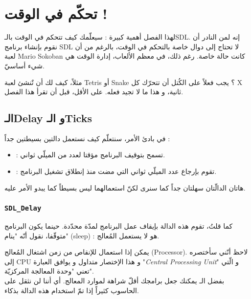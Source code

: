 \chapter{تحكّم في الوقت !}

لهذا الفصل أهمية كبيرة : سيعلّمك كيف تتحكم في الوقت بالـ\textenglish{SDL}.
 إنه لمن النادر أن نقوم بإنشاء برنامج
\textenglish{SDL}
لا تحتاج إلى دوال خاصة بالتحكم في الوقت، بالرغم من أن لعبة
\textenglish{Mario Sokoban}
كانت حالة خاصة. رغم ذلك، في معظم الألعاب، إدارة الوقت هي شيء أساسيّ.

مثلاً، كيف لك أن تٌنشئ لعبة 
\textenglish{Tetris}
أو
\textenglish{Snake} ؟
يجب فعلاً على الكُتل أن تتحرّك كل
\textenglish{X}
ثانية، و هذا ما لا تجيد فعله. على الأقل، قبل أن تقرأ هذا الفصل.

\section{الـ\textenglish{Delay} و الـ\textenglish{Ticks}}

في بادئ الأمر، سنتعلّم كيف نستعمل دالتين بسيطتين جداً :

\begin{itemize}
	\item {} :
	تسمح بتوقيف البرنامج مؤقتا لعدد من الميلّي ثواني.
	\item {} :
	تقوم بإرجاع عدد الميلّي ثواني التي مضت منذ إنطلاق تشغيل البرنامج.
\end{itemize}

هاتان الدالّتان سهلتان جداً كما سنرى لكنّ استعمالهما ليس بسيطاً كما يبدو الأمر عليه.

\subsection{\texttt{SDL\_Delay}}

كما قلتُ، تقوم هذه الدالة بإيقاف عمل البرنامج لمدّة محدّدة. حينما يكون البرنامج متوقّفا، نقول أنّه "ينام" 
(\textenglish{sleep}) :
 هو لا يستعمل المُعالج. 
 
 يمكن إذا استعمال 
للإنقاص من زمن اشتغال المُعالج 
(\textenglish{Processor}).
لاحظ أنّني سأختصره إلى 
\textenglish{CPU}
و هذا الإختصار متداول و يوافق العبارة 
"\textit{\textenglish{Central Processing Unit}}"
و الّتي تعني "وحدة المعالجة المركزيّة".\\
بفضل الـ
يمكنك جعل برامجك أقلّ شراهة لموارد المعالج. أي أننا لن نثقل على الحاسوب كثيراً إذا تمّ استخدام هذه الدالة بذكاء.

